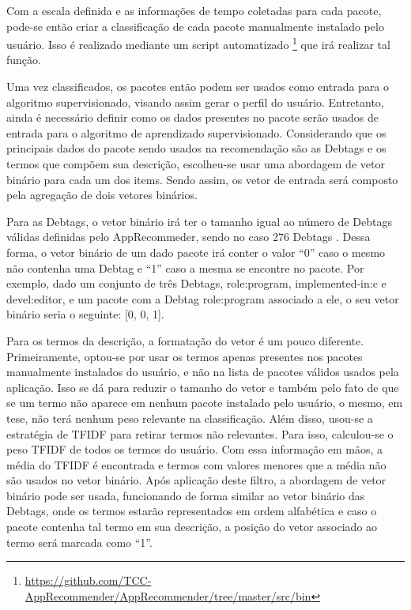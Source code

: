 Com a escala definida e as informações de tempo coletadas para cada pacote,
pode-se então criar a classificação de cada pacote manualmente instalado pelo
usuário.
Isso é realizado mediante um script automatizado \footnote{\url{https://github.com/TCC-AppRecommender/AppRecommender/tree/master/src/bin}}
que irá realizar tal função.

Uma vez classificados, os pacotes então podem ser usados como entrada para o
algoritmo supervisionado, visando assim gerar o perfil do usuário.
Entretanto, ainda é necessário definir como os dados presentes no pacote serão usados de entrada para o
algoritmo de aprendizado supervisionado. Considerando que os principais dados do pacote sendo usados na
recomendação são as Debtags e os termos que compõem sua descrição, escolheu-se usar uma abordagem de
vetor binário para cada um dos items. Sendo assim, os vetor de entrada será composto pela agregação de dois vetores
binários.

Para as Debtags, o vetor binário irá ter o tamanho igual ao número de Debtags
válidas definidas pelo AppRecommeder, sendo no caso 276 Debtags
\cite{araujo2011apprecommender}. Dessa forma,
o vetor binário de um dado pacote irá conter o valor ``0'' caso o mesmo não
contenha uma Debtag e ``1'' caso a mesma se encontre
no pacote. Por exemplo, dado um conjunto de três Debtags, role:program, implemented-in:c e devel:editor, e um pacote com a Debtag
role:program associado a ele, o seu vetor binário seria o seguinte: [0, 0, 1].

Para os termos da descrição, a formatação do vetor é um pouco diferente. Primeiramente, optou-se por usar os termos apenas presentes
nos pacotes manualmente instalados do usuário, e não na lista de pacotes válidos
usados pela aplicação. Isso se dá para reduzir o tamanho do vetor e também
pelo fato de que se um termo não aparece em nenhum pacote instalado pelo
usuário, o mesmo, em tese, não terá nenhum peso relevante na
classificação. Além disso, usou-se a estratégia de TFIDF para retirar termos não
relevantes. Para isso, calculou-se o peso TFIDF de todos os termos do usuário.
Com essa informação em mãos, a média do TFIDF é encontrada e termos com valores menores que a
média não são usados no vetor binário. Após aplicação deste filtro, a abordagem de vetor binário pode ser usada, funcionando de forma
similar ao vetor binário das Debtags, onde os termos estarão representados em ordem alfabética e caso o pacote contenha tal termo em sua
descrição, a posição do vetor associado ao termo será marcada como ``1''.

